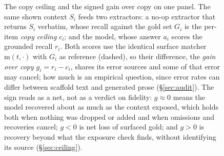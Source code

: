 \begin{figure}[t]
{}
\caption{The copy ceiling and the signed gain over copy on one panel. The same shown context $S_i$ feeds
two extractors: a no-op extractor that returns $S_i$ verbatim, whose recall against the gold set $G_i$
is the per-item \emph{copy ceiling} $c_i$; and the model, whose answer $a_i$ scores the grounded recall
$r_i$. Both scores use the identical surface matcher $\mathrm{m}(t,\cdot)$ with $G_i$ as reference
(dashed), so their difference, the \emph{gain over copy} $g_i=r_i-c_i$, shares its error sources and
some of that error may cancel; how much is an empirical question, since error rates can differ between
scaffold text and generated prose (\S\ref{sec:audit}). The sign reads as a net, not as a verdict on
fidelity: $g\approx0$ means the model recovered about as much as the context exposed, which holds both
when nothing was dropped or added and when omissions and recoveries cancel; $g<0$ is net loss of
surfaced gold; and $g>0$ is recovery beyond what the exposure check finds, without identifying its
source (\S\ref{sec:ceiling}).}
\label{fig:ceiling}
\end{figure}
